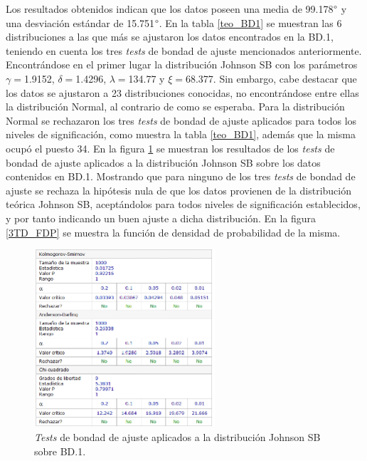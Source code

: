 \documentclass[12pt]{report}
\begin{document}
	 Los resultados obtenidos indican que los datos poseen una media de 99.178$\degree$ y una desviación estándar de 15.751$\degree$.
	 En la tabla \ref{teo_BD1}  se muestran las 6 distribuciones a las que más se ajustaron los datos encontrados en la BD.1, teniendo en cuenta los tres \textit{tests} de bondad de ajuste mencionados anteriormente. Encontrándose en el primer lugar la distribución Johnson SB con los parámetros $\gamma=$1.9152, $\delta=$1.4296, $\lambda=$134.77 y $\xi=$68.377. Sin embargo, cabe destacar que los datos se ajustaron a 23 distribuciones conocidas, no encontrándose entre ellas la distribución Normal, al contrario de como se esperaba. Para la distribución Normal se rechazaron los tres \textit{tests} de bondad de ajuste aplicados para todos los niveles de significación, como muestra la tabla \ref{teo_BD1}, además que la misma ocupó el puesto 34. En la figura \ref{3TD_BONDAD} se  muestran los resultados de los \textit{tests} de bondad de ajuste aplicados a la distribución Johnson SB sobre los datos contenidos en BD.1. Mostrando que para ninguno de los tres \textit{tests} de bondad de ajuste  se rechaza la hipótesis nula de que los datos provienen de la distribución teórica Johnson SB, aceptándolos para todos niveles de significación establecidos, y por tanto indicando un buen ajuste a dicha distribución. En la figura \ref{3TD_FDP}  se muestra la función de densidad de probabilidad de la misma.
	  	\begin{figure}[htbp]
	  	\centering
	  	
 	  	\includegraphics[width=0.6\textwidth]{3td_BONDAD.png}
	  	\caption{\textit{Tests} de bondad de ajuste aplicados a la distribución Johnson SB sobre BD.1.}
	  	\label{3TD_BONDAD}
	  \end{figure}
	  
\end{document}
